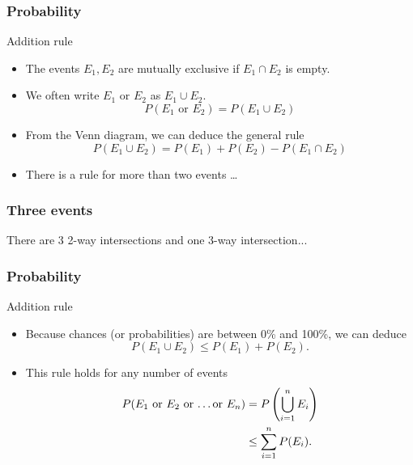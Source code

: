 \documentclass[handout]{beamer}
\begin{document}
   \begin{frame} \frametitle{Probability}

   \begin{block}
   {Addition rule}
   \begin{itemize}
   \item The events $E_1, E_2$ are mutually exclusive if $E_1 \cap E_2$ is empty.
   \item We often write $\text{$E_1$ or $E_2$}$ as $E_1 \cup E_2$.
   $$
   P(\text{$E_1$ or $E_2$}) = P(E_1 \cup E_2)
   $$

   \item From the Venn diagram, we can deduce the general rule
   $$
   P(E_1 \cup E_2) = P(E_1) + P(E_2) - P(E_1 \cap E_2)
   $$

   \item There is a rule for more than two events \dots
   \end{itemize}
   \end{block}
   \end{frame}



   \begin{frame}
   \frametitle{Three events}
   \begin{center}
   \end{center}
   There are 3 2-way intersections and one 3-way intersection...
   \end{frame}


   \begin{frame} \frametitle{Probability}

   \begin{block}
   {Addition rule}
   \begin{itemize}
   \item Because chances (or probabilities) are between 0\% and 100\%,
   we can deduce
   $$
   P(E_1 \cup E_2) \leq P(E_1) + P(E_2).
   $$
   \item This rule holds for any number of events
   $$
   \begin{aligned}
   P(\text{$E_1$ or $E_2$ or \dots or $E_n$}) &= P \left(\bigcup_{i=1}^n E_i \right) \\
   & \leq \sum_{i=1}^n P(E_i).
   \end{aligned}
   $$

   \end{itemize}
   \end{block}
   \end{frame}
\end{document}
